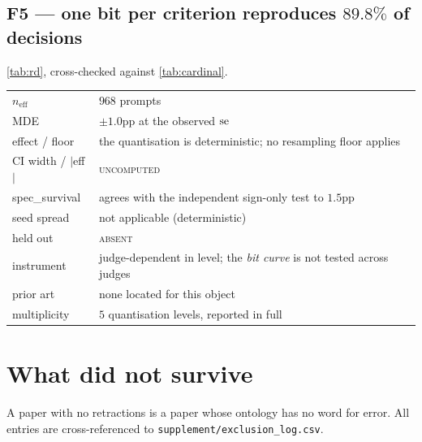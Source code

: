 \subsection{F5 --- one bit per criterion reproduces $89.8\%$ of decisions}

\cref{tab:rd}, cross-checked against \cref{tab:cardinal}.

\begin{table}[H]\centering\footnotesize
\begin{tabular}{ll}
\toprule
$n_{\text{eff}}$ & $968$ prompts\\
MDE & $\pm 1.0$pp at the observed $\operatorname{se}$\\
effect / floor & the quantisation is deterministic; no resampling floor applies\\
CI width / $|$eff$|$ & \textsc{uncomputed}\\
spec\_survival & agrees with the independent sign-only test to $1.5$pp\\
seed spread & not applicable (deterministic)\\
held out & \textsc{absent}\\
instrument & judge-dependent in level; the \emph{bit curve} is not tested across judges\\
prior art & none located for this object\\
multiplicity & $5$ quantisation levels, reported in full\\
\bottomrule
\end{tabular}
\end{table}

\section{What did not survive}
\label{sec:exclusion}

A paper with no retractions is a paper whose ontology has no word for error. All
entries are cross-referenced to \texttt{supplement/exclusion\_log.csv}.

